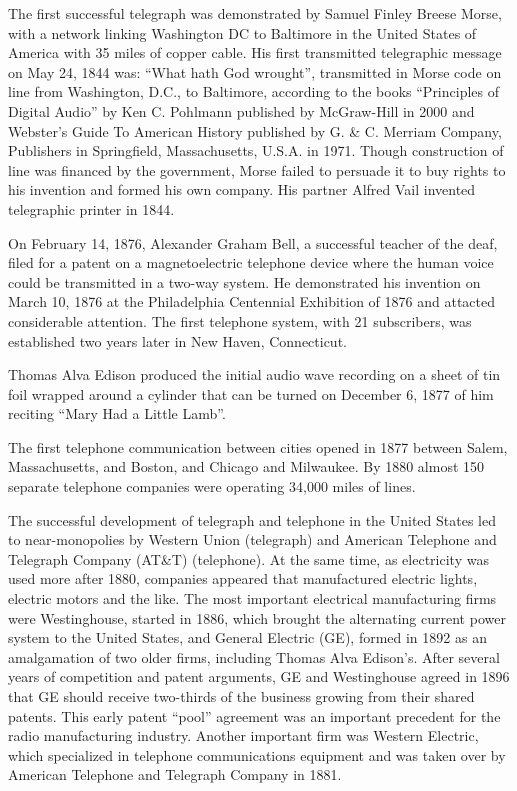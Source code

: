 \documentclass[a4paper,norsk,utf8]{report}
\begin{document}
    The first successful telegraph was demonstrated by Samuel Finley
    Breese Morse, with a network linking Washington DC to Baltimore in
    the United States of America with 35 miles of copper cable.  His
    first transmitted telegraphic message on May 24, 1844 was: ``What
    hath God wrought'', transmitted in Morse code on line from
    Washington, D.C., to Baltimore, according to the books
    ``Principles of Digital Audio'' by Ken C. Pohlmann published by
    McGraw-Hill in 2000 and Webster's Guide To American History
    published by G. \& C. Merriam Company, Publishers in Springfield,
    Massachusetts, U.S.A. in 1971.  Though construction of line was
    financed by the government, Morse failed to persuade it to buy
    rights to his invention and formed his own company.  His partner
    Alfred Vail invented telegraphic printer in 1844.

    On February 14, 1876, Alexander Graham Bell, a successful teacher
    of the deaf, filed for a patent on a magnetoelectric telephone
    device where the human voice could be transmitted in a two-way
    system.  He demonstrated his invention on March 10, 1876 at the
    Philadelphia Centennial Exhibition of 1876 and attacted
    considerable attention.  The first telephone system, with 21
    subscribers, was established two years later in New Haven,
    Connecticut.

    Thomas Alva Edison produced the initial audio wave recording on
    a sheet of tin foil wrapped around a cylinder that can be turned
    on December 6, 1877 of him reciting ``Mary Had a Little Lamb''.

    The first telephone communication between cities opened in 1877
    between Salem, Massachusetts, and Boston, and Chicago and Milwaukee.
    By 1880 almost 150 separate telephone companies were operating 34,000
    miles of lines.

    The successful development of telegraph and telephone in the
    United States led to near-monopolies by Western Union (telegraph)
    and American Telephone and Telegraph Company (AT\&T) (telephone).
    At the same time, as electricity was used more after 1880,
    companies appeared that manufactured electric lights, electric
    motors and the like.   The most important electrical manufacturing
    firms were Westinghouse, started in 1886, which brought the alternating
    current power system to the United States, and General Electric (GE),
    formed in 1892 as an amalgamation of two older firms, including
    Thomas Alva Edison's.   After several years of competition and
    patent arguments, GE and Westinghouse agreed in 1896 that GE should
    receive two-thirds of the business growing from their shared patents.
    This early patent ``pool'' agreement was an important precedent for
    the radio manufacturing industry.  Another important firm was Western
    Electric, which specialized in telephone communications equipment and
    was taken over by American Telephone and Telegraph Company in 1881.
\end{document}

